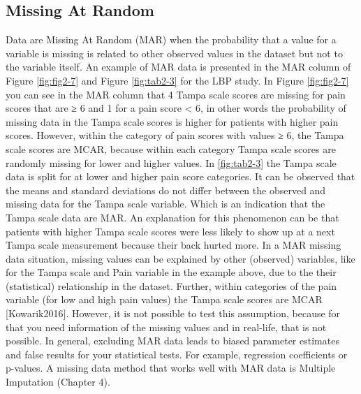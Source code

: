 \documentclass[]{book}
\begin{document}
\subsection{Missing At Random}\label{missing-at-random}

Data are Missing At Random (MAR) when the probability that a value for a
variable is missing is related to other observed values in the dataset
but not to the variable itself. An example of MAR data is presented in
the MAR column of Figure \ref{fig:fig2-7} and Figure \ref{fig:tab2-3}
for the LBP study. In Figure \ref{fig:fig2-7} you can see in the MAR
column that 4 Tampa scale scores are missing for pain scores that are ≥
6 and 1 for a pain score \textless{} 6, in other words the probability
of missing data in the Tampa scale scores is higher for patients with
higher pain scores. However, within the category of pain scores with
values ≥ 6, the Tampa scale scores are MCAR, because within each
category Tampa scale scores are randomly missing for lower and higher
values. In \ref{fig:tab2-3} the Tampa scale data is split for at lower
and higher pain score categories. It can be observed that the means and
standard deviations do not differ between the observed and missing data
for the Tampa scale variable. Which is an indication that the Tampa
scale data are MAR. An explanation for this phenomenon can be that
patients with higher Tampa scale scores were less likely to show up at a
next Tampa scale measurement because their back hurted more. In a MAR
missing data situation, missing values can be explained by other
(observed) variables, like for the Tampa scale and Pain variable in the
example above, due to the their (statistical) relationship in the
dataset. Further, within categories of the pain variable (for low and
high pain values) the Tampa scale scores are MCAR {[}Kowarik2016{]}.
However, it is not possible to test this assumption, because for that
you need information of the missing values and in real-life, that is not
possible. In general, excluding MAR data leads to biased parameter
estimates and false results for your statistical tests. For example,
regression coefficients or p-values. A missing data method that works
well with MAR data is Multiple Imputation (Chapter 4).
\end{document}
